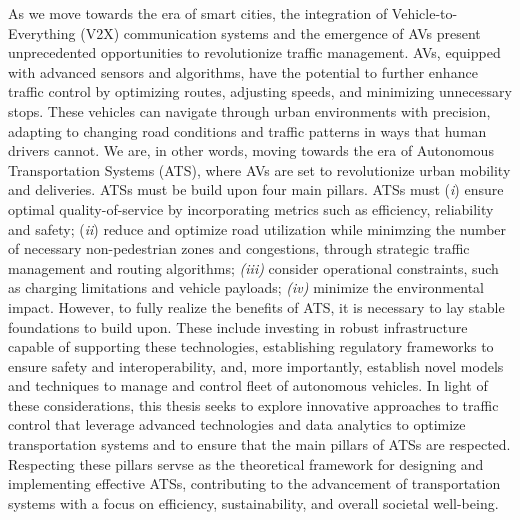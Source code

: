 As we move towards the era of smart cities, the integration of Vehicle-to-Everything (V2X) communication systems and the emergence of AVs present unprecedented opportunities to revolutionize traffic management. AVs, equipped with advanced sensors and algorithms, have the potential to further enhance traffic control by optimizing routes, adjusting speeds, and minimizing unnecessary stops. These vehicles can navigate through urban environments with precision, adapting to changing road conditions and traffic patterns in ways that human drivers cannot. We are, in other words, moving towards the era of Autonomous Transportation Systems (ATS), where AVs are set to revolutionize urban mobility and deliveries. ATSs must be build upon four main pillars. ATSs must (\textit{i}) ensure optimal quality-of-service by incorporating metrics such as efficiency, reliability and safety; (\textit{ii}) reduce and optimize road utilization while minimzing the number of necessary non-pedestrian zones and congestions, through strategic traffic management and routing algorithms; \textit{(iii)} consider operational constraints, such as charging limitations and vehicle payloads; \textit{(iv)} minimize the environmental impact. 
However, to fully realize the benefits of ATS, it is necessary to lay stable foundations to build upon. These include investing in robust infrastructure capable of supporting these technologies, establishing regulatory frameworks to ensure safety and interoperability, and, more importantly, establish novel models and techniques to manage and control fleet of autonomous vehicles. In light of these considerations, this thesis seeks to explore innovative approaches to traffic control that leverage advanced technologies and data analytics to optimize transportation systems and to ensure that the main pillars of ATSs are respected. Respecting these pillars servse as the theoretical framework for designing and implementing effective ATSs, contributing to the advancement of transportation systems with a focus on efficiency, sustainability, and overall societal well-being.

